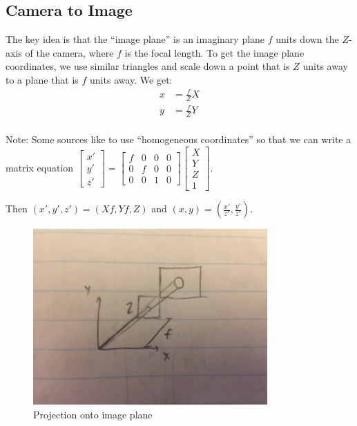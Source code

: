 \documentclass{article}
\begin{document}
\subsection{Camera to Image}
The key idea is that the ``image plane'' is an imaginary plane $f$ units down the $Z$-axis of the camera, where $f$ is the focal length. 
To get the image plane coordinates, we use similar triangles and scale down a point that is $Z$ units away to a plane that is $f$ units away. We get:
\begin{align*}
x&=\frac{f}{Z}X \\
y&=\frac{f}{Z}Y \\
\end{align*}

Note: Some sources like to use ``homogeneous coordinates'' so that we can write a matrix equation
 $\begin{bmatrix} x' \\ y' \\ z' \end{bmatrix}=\begin{bmatrix} f & 0 & 0 & 0 \\ 0 & f & 0 & 0 \\ 0 & 0 & 1 & 0 \end{bmatrix}\begin{bmatrix} X \\ Y \\ Z \\ 1 \end{bmatrix}$. 
 
 Then $(x', y', z')=(Xf, Yf, Z)$ and $(x, y)=(\frac{x'}{z'}, \frac{y'}{z'})$. 

\begin{figure}[H]
\includegraphics[width=0.8\textwidth]{Image_Plane}
\centering
\caption*{Projection onto image plane}
\end{figure}
\end{document}
